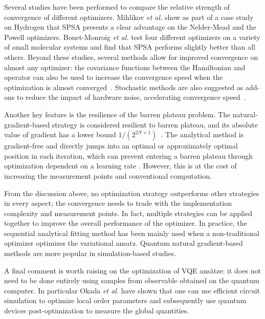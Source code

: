 Several studies have been performed to compare the relative strength of convergence of different optimizers. Mihlikov \textit{et al.} \cite{Mihlikov2022} show as part of a case study on Hydrogen that SPSA presents a clear advantage on the Nelder-Mead and the Powell optimizers. Bonet-Monroig \textit{et al.} \cite{BonetMonroig2021} test four different optimizers on a variety of small molecular systems and find that SPSA performs slightly better than all others. Beyond these studies, several methods allow for improved convergence on almost any optimizer: the covariance functions between the Hamiltonian and operator can also be used to increase the convergence speed when the optimization is almost converged~\cite{BoydCoVar2022}. Stochastic methods are also suggested as add-ons to reduce the impact of hardware noise, accelerating convergence speed~\cite{AcceleratingProcessesMueller2021,StochasticApplications2022Gidi,PattiMarkovChain2021}.  

Another key feature is the resilience of the barren plateau problem. The natural-gradient-based strategy is considered resilient to barren plateau, and its absolute value of gradient has a lower bound $1/(2^{2N+1})$~\cite{haug_capacity_2021,haug_optimal_2021}.  The analytical method is gradient-free and directly jumps into an optimal or approximately optimal position in each iteration, which can prevent entering a barren plateau through optimization dependent on a learning rate \cite{Vidal2018, nakanishi_sequential_2020,ostaszewskiStructureOptimizationParameterized2021,koczor_quantum_2020}. However, this is at the cost of increasing the measurement points and conventional computation. 

From the discussion above, no optimization strategy outperforms other strategies in every aspect; the convergence needs to trade with the implementation complexity and measurement points. In fact, multiple strategies can be applied together to improve the overall performance of the optimizer. In practice, the sequential analytical fitting method has been mainly used when a non-traditional optimizer optimizes the variational ansatz. Quantum natural gradient-based methods are more popular in simulation-based studies. 

A final comment is worth raising on the optimization of VQE ans{\"{a}}tze: it does not need to be done entirely using samples from observable obtained on the quantum computer. In particular Okada \textit{et al.} \cite{Okada2022} have shown that one can use efficient circuit simulation to optimize local order parameters and subsequently use quantum devices post-optimization to measure the global quantities. 